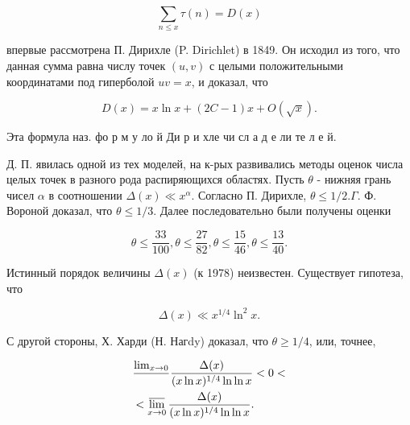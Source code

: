 \documentclass[10pt]{article}
\begin{document}
\[

\sum_{n \leqslant x} \tau(n)=D(x)

\]



впервые рассмотрена П. Дирихле (P. Dirichlet) в 1849. Он исходил из того, что данная сумма равна числу точек $(u, v)$ с целыми положительными координатами под гиперболой $u v=x$, и доказал, что



\[

D(x)=x \ln x+(2 C-1) x+O(\sqrt{x}) .

\]



Эта формула наз. фо р м у ло й Ди р и хле чи сл а д е ли те л е й.



Д. П. явилась одной из тех моделей, на к-рых развивались методы оценок числа целых точек в разного рода распиряющихся областях. Пусть $\theta$ - нижняя грань чисел $\alpha$ в соотношении $\Delta(x) \ll x^{\alpha}$. Согласно П. Дирихле, $\theta \leqslant 1 / 2 . \Gamma$. Ф. Вороной доказал, что $\theta \leqslant 1 / 3$. Далее последовательно были получены оценки



\[

\theta \leqslant \frac{33}{100}, \theta \leqslant \frac{27}{82}, \theta \leqslant \frac{15}{46}, \theta \leqslant \frac{13}{40} .

\]



Истинный порядок величины $\Delta(x)$ (к 1978) неизвестен. Существует гипотеза, что



\[

\Delta(x) \ll x^{1 / 4} \ln ^{2} x .

\]



С другой стороны, Х. Харди (Н. Нагdy) доказал, что $\theta \geqslant 1 / 4$, или, точнее,



\[

\begin{aligned}

& \frac{\lim _{x \rightarrow 0}}{} \frac{\Delta(x)}{(x \ln x)^{1 / 4} \ln \ln x}<0< \\

&<\varlimsup_{x \rightarrow 0} \frac{\Delta(x)}{(x \ln x)^{1 / 4} \ln \ln x} .

\end{aligned}

\]
\end{document}
